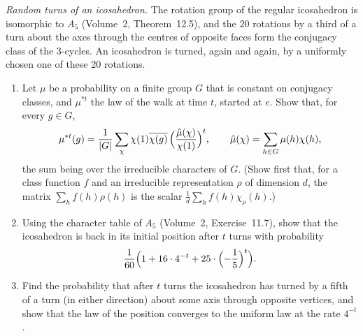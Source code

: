 \begin{exercise}[$\star\star\star$]\label{pb:dodecaturns}
\emph{Random turns of an icosahedron.} The rotation group of the regular icosahedron is isomorphic to $A_5$ (Volume~2, Theorem~12.5), and the
$20$ rotations by a third of a turn about the axes through the centres of opposite faces form the conjugacy class of the
$3$-cycles. An icosahedron is turned, again and again, by a uniformly chosen one of these $20$ rotations.
\begin{enumerate}[label=(\alph*)]
\item Let $\mu$ be a probability on a finite group $G$ that is constant on conjugacy classes, and $\mu^{*t}$ the law of the walk at time
$t$, started at $e$. Show that, for every $g\in G$,
\[
\mu^{*t}(g)=\frac1{|G|}\sum_\chi\chi(1)\overline{\chi(g)}\,\Bigl(\frac{\hat\mu(\chi)}{\chi(1)}\Bigr)^t,\qquad\hat\mu(\chi)=\sum_{h\in G}\mu(h)\chi(h),
\]
the sum being over the irreducible characters of $G$. (Show first that, for a class function $f$ and an irreducible representation $\rho$ of
dimension $d$, the matrix $\sum_hf(h)\rho(h)$ is the scalar $\frac1d\sum_hf(h)\chi_\rho(h)$.)
\item Using the character table of $A_5$ (Volume~2, Exercise~11.7), show that the icosahedron is back in its initial position after $t$
turns with probability
\[
\frac1{60}\Bigl(1+16\cdot4^{-t}+25\cdot\Bigl(-\frac15\Bigr)^t\Bigr).
\]
\item Find the probability that after $t$ turns the icosahedron has turned by a fifth of a turn (in either direction) about some
axis through opposite vertices, and show that the law of the position converges to the uniform law at the rate $4^{-t}$.
\end{enumerate}
\end{exercise}

